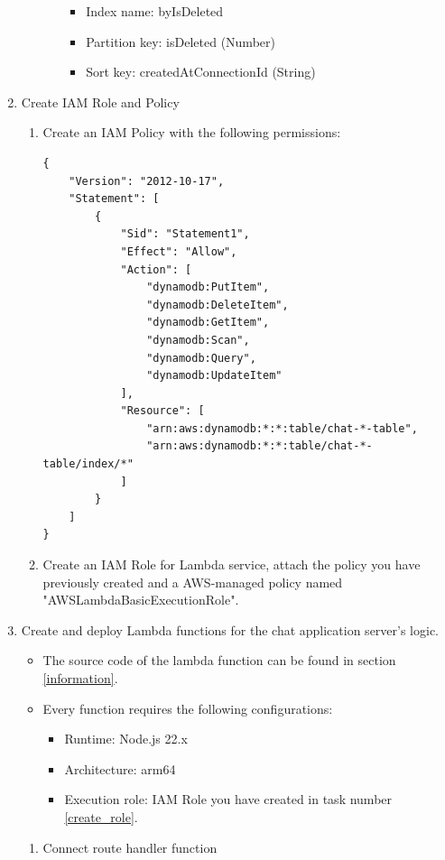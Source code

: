 \documentclass{article}
\begin{document}
\begin{enumerate}
\begin{enumerate}
\begin{itemize}
\begin{itemize}
        \item Index name: byIsDeleted
        \item Partition key: isDeleted (Number)
        \item Sort key: createdAtConnectionId (String)
      \end{itemize}
    \end{itemize}
  \end{enumerate}
\item \label{create_role} Create IAM Role and Policy
  \begin{enumerate}
    \item Create an IAM Policy with the following permissions:
    \begin{verbatim}
{
    "Version": "2012-10-17",
    "Statement": [
        {
            "Sid": "Statement1",
            "Effect": "Allow",
            "Action": [
                "dynamodb:PutItem",
                "dynamodb:DeleteItem",
                "dynamodb:GetItem",
                "dynamodb:Scan",
                "dynamodb:Query",
                "dynamodb:UpdateItem"
            ],
            "Resource": [
                "arn:aws:dynamodb:*:*:table/chat-*-table",
                "arn:aws:dynamodb:*:*:table/chat-*-table/index/*"
            ]
        }
    ]
}
    \end{verbatim}
    \item Create an IAM Role for Lambda service, attach the policy you have previously created and a AWS-managed policy named "AWSLambdaBasicExecutionRole".
  \end{enumerate}
\item \label{create_function} Create and deploy Lambda functions for the chat application server's logic.
  \begin{itemize}
    \item The source code of the lambda function can be found in section \ref{information}.
    \item Every function requires the following configurations:
    \begin{itemize}
      \item Runtime: Node.js 22.x
      \item Architecture: arm64
      \item Execution role: IAM Role you have created in task number \ref{create_role}.
    \end{itemize}
  \end{itemize}
  \begin{enumerate}
    \item Connect route handler function

\end{enumerate}
\end{enumerate}
\end{document}
